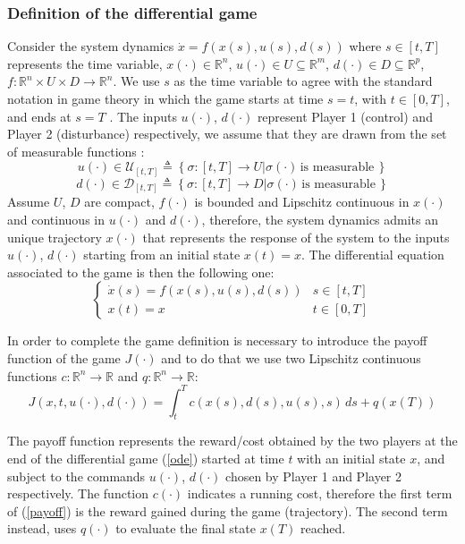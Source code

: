 \subsubsection{Definition of the differential game}
Consider the system dynamics $\dot{x}=f(x(s), u(s), d(s))$ where $s \in [t, T]$ represents the time variable, $x(\cdot)\in\mathbb{R}^n$, $u(\cdot)\in U\subseteq \mathbb{R}^m$, $d(\cdot)\in D\subseteq \mathbb{R}^p$, $f:\mathbb{R}^n \times U \times D \rightarrow \mathbb{R}^n$. We use $s$ as the time variable to agree with the standard notation in game theory in which the game starts at time $s=t$, with $t \in [0, T]$, and ends at $s=T$ \cite{evans}.
The inputs $u(\cdot)$, $d(\cdot)$ represent Player 1 (control) and Player 2 (disturbance) respectively, we assume that they are drawn from the set of measurable functions \cite{evans}\cite{brief_intro}:
\[ 
    u(\cdot) \in \mathcal{U}_{[t, T]}  \triangleq 
    \left\{
        \sigma: [t, T] \rightarrow U| \sigma(\cdot) \, \textrm{is measurable} \, 
    \right\} 
\]
\[ 
    d(\cdot) \in \mathcal{D}_{[t, T]}  \triangleq 
    \left\{
        \sigma: [t, T] \rightarrow D| \sigma(\cdot) \, \textrm{is measurable} \, 
    \right\} 
\]
Assume $U$, $D$ are compact, $f(\cdot)$ is bounded and Lipschitz continuous in $x(\cdot)$ and continuous in $u(\cdot)$ and $d(\cdot)$, therefore, the system dynamics admits an unique trajectory $x(\cdot)$ that represents the response of the system to the inputs $u(\cdot)$, $d(\cdot)$ starting from an initial state $x(t)=x$.
The differential equation associated to the game is then the following one:
\begin{equation}
	\label{ode}
	\left\{
		\begin{array}{ll}
			\dot{x}(s)=f(x(s), u(s), d(s))  & s \in [t, T] \\
			x(t) = x & t \in [0, T]
		\end{array}
	\right.
\end{equation}

In order to complete the game definition is necessary to introduce the payoff function of the game $J(\cdot)$ and to do that we use two Lipschitz continuous functions $c:\mathbb{R}^n \rightarrow \mathbb{R}$ and $q:\mathbb{R}^n \rightarrow \mathbb{R}$:
\begin{equation}
	\label{payoff}
	J(x, t, u(\cdot), d(\cdot)) = \int_{t}^{T} c(x(s),d(s),u(s),s)  \,ds + q(x(T)) 
\end{equation}

The payoff function represents the reward/cost obtained by the two players at the end of the differential game (\ref{ode}) started at time $t$ with an initial state $x$, and subject to the commands  $u(\cdot)$, $d(\cdot)$ chosen by Player 1 and Player 2 respectively. The function $c(\cdot)$ indicates a running cost, therefore the first term of (\ref{payoff}) is the reward gained during the game (trajectory). The second term instead, uses $q(\cdot)$ to evaluate the final state $x(T)$ reached.
\newline

